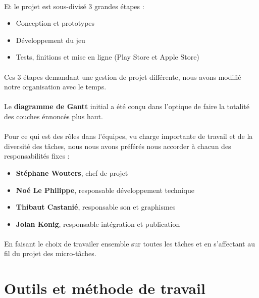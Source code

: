 \paragraph{}
Et le projet est sous-divisé 3 grandes étapes :
\begin{itemize}
\item Conception et prototypes
\item Développement du jeu
\item Tests, finitions et mise en ligne (Play Store et Apple Store)
\end{itemize}

\paragraph{}
Ces 3 étapes demandant une gestion de projet différente, nous avons modifié notre organisation avec le temps.

\paragraph{}
Le \textbf{diagramme de Gantt} initial a été conçu dans l’optique de faire la totalité des couches énnoncés plus haut.

\paragraph{}
Pour ce qui est des rôles dans l’équipes, vu charge importante de travail et de la diversité des tâches, nous nous avons préférés nous accorder à chacun des responsabilités fixes :

\begin{itemize}
\item \textbf{Stéphane Wouters}, chef de projet
\item \textbf{Noé Le Philippe}, responsable développement technique
\item \textbf{Thibaut Castanié}, responsable son et graphismes
\item \textbf{Jolan Konig}, responsable intégration et publication
\end{itemize}

\paragraph{}
En faisant le choix de travailer ensemble sur toutes les tâches et en s’affectant au fil du projet des micro-tâches.

\section{Outils et méthode de travail}

